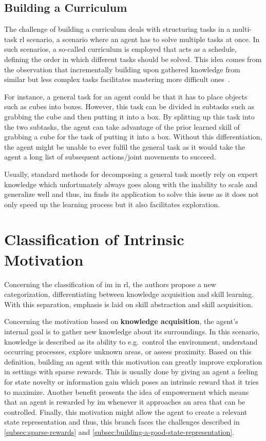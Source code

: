 \documentclass[draft,final]{vutinfth} %
\begin{document}
    \subsection{Building a Curriculum}\label{subsec:building-a-curriculum}
    The challenge of building a curriculum deals with structuring tasks in a multi-task \gls{rl} scenario, a scenario where an agent has to solve multiple tasks at once.
    In such scenarios, a so-called curriculum is employed that acts as a schedule, defining the order in which different tasks should be solved.
    This idea comes from the observation that incrementally building upon gathered knowledge from similar but less complex tasks facilitates mastering more difficult ones~\citep{aubret_survey_2019}.

    For instance, a general task for an agent could be that it has to place objects such as cubes into boxes.
    However, this task can be divided in subtasks such as grabbing the cube and then putting it into a box.
    By splitting up this task into the two subtasks, the agent can take advantage of the prior learned skill of grabbing a cube for the task of putting it into a box.
    Without this differentiation, the agent might be unable to ever fulfil the general task as it would take the agent a long list of subsequent actions/joint movements to succeed.

    Usually, standard methods for decomposing a general task mostly rely on expert knowledge which unfortunately always goes along with the inability to scale and generalize well and thus, \gls{im} finds its application to solve this issue as it does not only speed up the learning process but it also facilitates exploration.


    \section{Classification of Intrinsic Motivation}

    Concerning the classification of \gls{im} in \gls{rl}, the authors \citeauthor{aubret_survey_2019} propose a new categorization, differentiating between knowledge acquisition and skill learning.
    With this separation, emphasis is laid on skill abstraction and skill acquisition.

    Concerning the motivation based on \textbf{knowledge acquisition}, the agent's internal goal is to gather new knowledge about its surroundings.
    In this scenario, knowledge is described as its ability to e.g.\ control the environment, understand occurring processes, explore unknown areas, or assess proximity.
    Based on this definition, building an agent with this motivation can greatly improve exploration in settings with sparse rewards.
    This is usually done by giving an agent a feeling for state novelty or information gain which poses an intrinsic reward that it tries to maximize.
    Another benefit presents the idea of empowerment which means that an agent is rewarded by \gls{im} whenever it approaches an area that can be controlled.
    Finally, this motivation might allow the agent to create a relevant state representation and thus, this branch faces the challenges described in \autoref{subsec:sparse-rewards} and \autoref{subsec:building-a-good-state-representation}.
\end{document}
